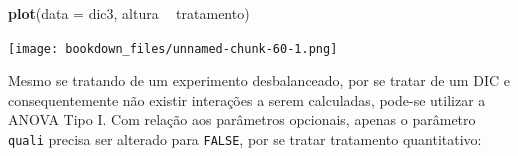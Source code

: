 \documentclass[
]{article}
\newenvironment{Shaded}{\begin{snugshade}}{\end{snugshade}}
\newcommand{\DataTypeTok}[1]{\textcolor[rgb]{0.13,0.29,0.53}{#1}}
\newcommand{\KeywordTok}[1]{\textcolor[rgb]{0.13,0.29,0.53}{\textbf{#1}}}
\newcommand{\NormalTok}[1]{#1}
\newcommand{\OperatorTok}[1]{\textcolor[rgb]{0.81,0.36,0.00}{\textbf{#1}}}
\newcommand{\OtherTok}[1]{\textcolor[rgb]{0.56,0.35,0.01}{#1}}
\newcommand{\StringTok}[1]{\textcolor[rgb]{0.31,0.60,0.02}{#1}}
\begin{document}
\begin{Shaded}
\begin{Highlighting}[]
\KeywordTok{plot}\NormalTok{(}\DataTypeTok{data =}\NormalTok{ dic3, altura }\OperatorTok{~}\StringTok{ }\NormalTok{tratamento)}
\end{Highlighting}
\end{Shaded}

\texttt{[image: bookdown\_files/unnamed-chunk-60-1.png]}

Mesmo se tratando de um experimento desbalanceado, por se tratar de um DIC e consequentemente não existir interações a serem calculadas, pode-se utilizar a ANOVA Tipo I. Com relação aos parâmetros opcionais, apenas o parâmetro \texttt{quali} precisa ser alterado para \texttt{FALSE}, por se tratar tratamento quantitativo:

\begin{Shaded}
\end{Shaded}
\end{document}
